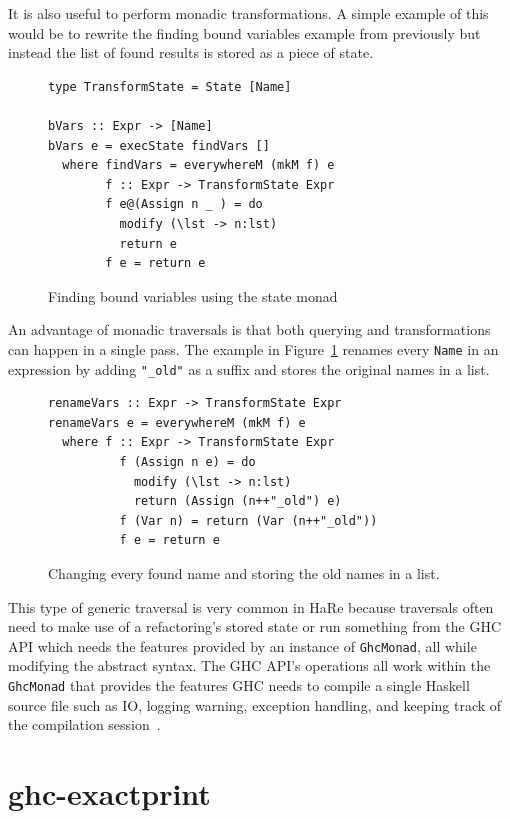 It is also useful to perform monadic transformations. A simple example of this would be to rewrite the finding bound variables example from previously but instead the list of found results is stored as a piece of state.

\begin{figure}[t]
\begin{lstlisting}
type TransformState = State [Name]

bVars :: Expr -> [Name]
bVars e = execState findVars []
  where findVars = everywhereM (mkM f) e
        f :: Expr -> TransformState Expr
        f e@(Assign n _ ) = do
          modify (\lst -> n:lst)
          return e
        f e = return e
\end{lstlisting}
\caption{Finding bound variables using the state monad}
\end{figure}

An advantage of monadic traversals is that both querying and transformations can happen in a single pass. The example in Figure~\ref{renameVars} renames every \texttt{Name} in an expression by adding \texttt{"\_old"} as a suffix and stores the original names in a list. 

\begin{figure}[t]
\begin{lstlisting}
renameVars :: Expr -> TransformState Expr
renameVars e = everywhereM (mkM f) e
  where f :: Expr -> TransformState Expr
          f (Assign n e) = do
            modify (\lst -> n:lst)
            return (Assign (n++"_old") e)
          f (Var n) = return (Var (n++"_old"))
          f e = return e
\end{lstlisting}
\caption{Changing every found name and storing the old names in a list.}
\label{renameVars}
\end{figure}
 
This type of generic traversal is very common in HaRe because traversals often need to make use of a refactoring's stored state or run something from the GHC API which needs the features provided by an instance of \texttt{GhcMonad}, all while modifying the abstract syntax. The GHC API's operations all work within the \texttt{GhcMonad} that provides the features GHC needs to compile a single Haskell source file such as IO, logging warning, exception handling, and keeping track of the compilation session~\citep{ghcApi}.   
	 
\section{ghc-exactprint}
\label{ghcExactprint}

